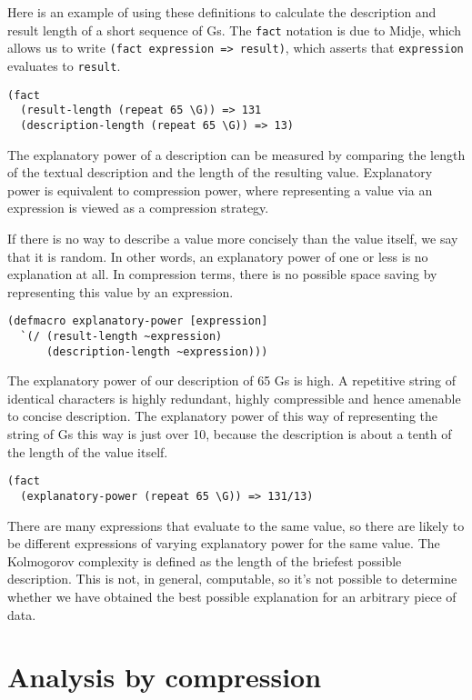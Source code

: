 \documentclass[numbers, preprint]{sigplanconf}
\begin{document}
Here is an example of using these definitions to calculate the description and result length of a short sequence of Gs.
The \verb|fact| notation is due to Midje, which allows us to write \verb|(fact expression => result)|,
which asserts that \verb|expression| evaluates to \verb|result|.

\begin{verbatim}
(fact
  (result-length (repeat 65 \G)) => 131
  (description-length (repeat 65 \G)) => 13)
\end{verbatim}

The explanatory power of a description can be measured by comparing the length of the textual description and the length
of the resulting value. Explanatory power is equivalent to compression power, where representing a value via an
expression is viewed as a compression strategy.

If there is no way to describe a value more concisely than the value itself, we say that it is random. In other words, an
explanatory power of one or less is no explanation at all. In compression terms, there is no possible space saving
by representing this value by an expression.

\begin{verbatim}
(defmacro explanatory-power [expression]
  `(/ (result-length ~expression)
      (description-length ~expression)))
\end{verbatim}

The explanatory power of our description of 65 Gs is high. A repetitive string of identical characters is
highly redundant, highly compressible and hence amenable to concise description. The explanatory power of this way of
representing the string of Gs this way is just over 10, because the description is about a tenth of the length of the
value itself.

\begin{verbatim}
(fact
  (explanatory-power (repeat 65 \G)) => 131/13)
\end{verbatim}

There are many expressions that evaluate to the same value, so there are likely to be different expressions of varying
explanatory power for the same value. The Kolmogorov complexity is defined as the length of the briefest possible description.
This is not, in general, computable, so it's not possible to determine whether we have obtained the best possible explanation
for an arbitrary piece of data.

\section{Analysis by compression}
\end{document}
